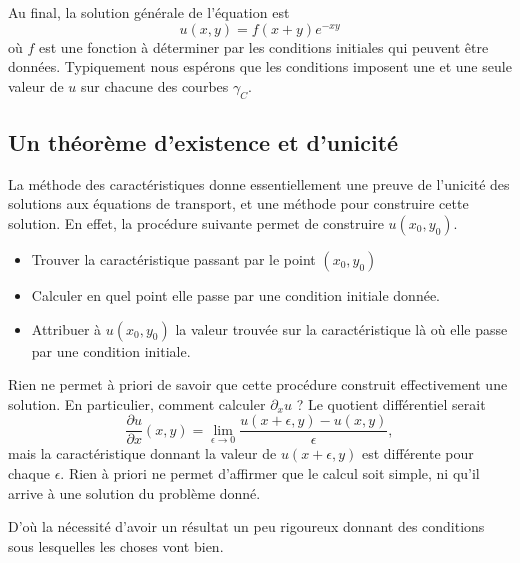 Au final, la solution générale de l'équation est
\begin{equation}
	u(x,y)=f(x+y) e^{-xy}
\end{equation}
où \( f\) est une fonction à déterminer par les conditions initiales qui peuvent être données. Typiquement nous espérons que les conditions imposent une et une seule valeur de \( u\) sur chacune des courbes \( \gamma_C\).

\subsection{Un théorème d'existence et d'unicité}

La méthode des caractéristiques donne essentiellement une preuve de l'unicité des solutions aux équations de transport, et une méthode pour construire cette solution. En effet, la procédure suivante permet de construire \( u(x_0,y_0)\).
\begin{itemize}
	\item Trouver la caractéristique passant par le point \( (x_0,y_0)\)
	\item Calculer en quel point elle passe par une condition initiale donnée.
	\item Attribuer à \( u(x_0,y_0)\) la valeur trouvée sur la caractéristique là où elle passe par une condition initiale.
\end{itemize}
Rien ne permet à priori de savoir que cette procédure construit effectivement une solution. En particulier, comment calculer \( \partial_xu\) ? Le quotient différentiel serait
\begin{equation}
	\frac{ \partial u }{ \partial x }(x,y)=\lim_{\epsilon\to 0}\frac{ u(x+\epsilon,y)-u(x,y) }{ \epsilon },
\end{equation}
mais la caractéristique donnant la valeur de \( u(x+\epsilon,y)\) est différente pour chaque \( \epsilon\). Rien à priori ne permet d'affirmer que le calcul soit simple, ni qu'il arrive à une solution du problème donné.

D'où la nécessité d'avoir un résultat un peu rigoureux donnant des conditions sous lesquelles les choses vont bien.

